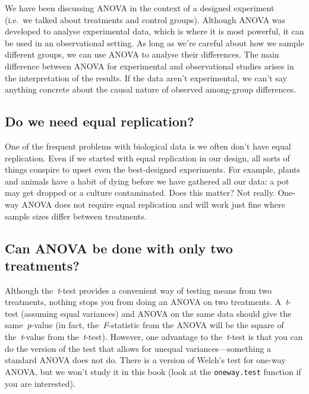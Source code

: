 \documentclass[
]{book}
\begin{document}
We have been discussing ANOVA in the context of a designed experiment (i.e.~we talked about treatments and control groups). Although ANOVA was developed to analyse experimental data, which is where it is most powerful, it can be used in an observational setting. As long as we're careful about how we sample different groups, we can use ANOVA to analyse their differences. The main difference between ANOVA for experimental and observational studies arises in the interpretation of the results. If the data aren't experimental, we can't say anything concrete about the causal nature of observed among-group differences.

\hypertarget{do-we-need-equal-replication}{%
\subsection{Do we need equal replication?}\label{do-we-need-equal-replication}}

One of the frequent problems with biological data is we often don't have equal replication. Even if we started with equal replication in our design, all sorts of things conspire to upset even the best-designed experiments. For example, plants and animals have a habit of dying before we have gathered all our data: a pot may get dropped or a culture contaminated. Does this matter? Not really. One-way ANOVA does not require equal replication and will work just fine where sample sizes differ between treatments.

\hypertarget{can-anova-be-done-with-only-two-treatments}{%
\subsection{Can ANOVA be done with only two treatments?}\label{can-anova-be-done-with-only-two-treatments}}

Although the~\emph{t}-test provides a convenient way of testing means from two treatments, nothing stops you from doing an ANOVA on two treatments. A~\emph{t}-test (assuming equal variances) and ANOVA on the same data should give the same~\emph{p}-value (in fact, the~\emph{F}-statistic from the ANOVA will be the square of the~\emph{t}-value from the~\emph{t}-test). However, one advantage to the~\emph{t}-test is that you can do the version of the test that allows for unequal variances---something a standard ANOVA does not do. There is a version of Welch's test for one-way ANOVA, but we won't study it in this book (look at the \texttt{oneway.test} function if you are interested).
\end{document}
